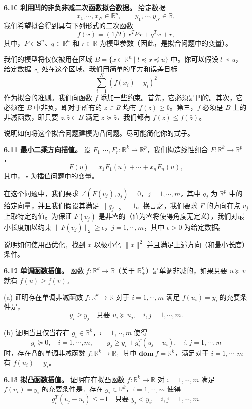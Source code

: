 \documentclass[UTF8, 12pt, fontset=fandol, oneside]{ctexart}
\begin{document}
\noindent\textbf{6.10 利用凹的非负非减二次函数拟合数据。}\quad
给定数据
\[
x_1,\cdots,x_N\in\mathbb{R}^n,\qquad y_1,\cdots,y_N\in\mathbb{R},
\]
我们希望拟合得到具有下列形式的二次函数
\[
f(x)=(1/2)x^TPx+q^Tx+r,
\]
其中，$P\in\mathbf{S}^n$、$q\in\mathbb{R}^n$ 和 $r\in\mathbb{R}$ 为模型参数（因此，是拟合问题中的变量）。

我们的模型将仅仅被用在区域 $B=\{x\in\mathbb{R}^n\mid l\preceq x\preceq u\}$ 中。你可以假设 $l\prec u$，给定数据 $x_i$ 处在这个区域。我们用简单的平方和误差目标
\[
\sum_{i=1}^N(f(x_i)-y_i)^2
\]
作为拟合的准则。我们向函数 $f$ 添加一些约束。首先，它必须是凹的。其次，它必须在 $B$ 中非负，即对于所有的 $z\in B$ 均有 $f(z)\geq 0$。第三，$f$ 必须是 $B$ 上的非减函数，即只要 $z,\bar{z}\in B$ 满足 $z\succeq \bar{z}$，我们都有 $f(z)\leq f(\bar{z})$。

说明如何将这个拟合问题建模为凸问题。尽可能简化你的式子。

\noindent\textbf{6.11 最小二乘方向插值。}\quad
设 $F_1,\cdots,F_n:\mathbb{R}^k\to\mathbb{R}^p$，我们构造线性组合 $F:\mathbb{R}^k\to\mathbb{R}^p$，
\[
F(u)=x_1F_1(u)+\cdots+x_nF_n(u),
\]
其中，$x$ 为插值问题中的变量。

在这个问题中，我们要求 $\angle(F(v_j),q_j)=0$，$j=1,\cdots,m$，其中 $q_j$ 为 $\mathbb{R}^p$ 中的给定向量，并且我们假设其满足 $\|q_j\|_2=1$。换言之，我们要求 $F$ 的方向在点 $v_j$ 上取特定的值。为保证 $F(v_j)$ 是非零的（值为零将使得角度无定义），我们对最小长度加以约束 $\|F(v_j)\|_2\geq \epsilon$，$j=1,\cdots,m$，其中 $\epsilon>0$ 为给定数据。

说明如何使用凸优化，找到 $x$ 以极小化 $\|x\|^2$ 并且满足上述方向（和最小长度）条件。

\noindent\textbf{6.12 单调函数插值。}\quad
函数 $f:\mathbb{R}^k\to\mathbb{R}$（关于 $\mathbb{R}_+^k$）是单调非减的，如果只要 $u\succeq v$ 就有 $f(u)\geq f(v)$。

(a) 证明存在单调非减函数 $f:\mathbb{R}^k\to\mathbb{R}$ 对于 $i=1,\cdots,m$ 满足 $f(u_i)=y_i$ 的充要条件是，
\[
y_i\geq y_j\quad \text{只要 }u_i\succeq u_j,\quad i,j=1,\cdots,m.
\]

(b) 证明当且仅当存在 $g_i\in\mathbb{R}^k$，$i=1,\cdots,m$ 使得
\[
g_i\succeq 0,\quad i=1,\cdots,m,\qquad
y_j\geq y_i+g_i^T(u_j-u_i),\quad i,j=1,\cdots,m
\]
时，存在凸的单调非减函数 $f:\mathbb{R}^k\to\mathbb{R}$，其中 $\mathbf{dom}\ f=\mathbb{R}^k$，满足对于 $i=1,\cdots,m$ 有 $f(u_i)=y_i$。

\noindent\textbf{6.13 拟凸函数插值。}\quad
证明存在拟凸函数 $f:\mathbb{R}^k\to\mathbb{R}$ 对 $i=1,\cdots,m$ 满足 $f(u_i)=y_i$ 的充要条件是，存在 $g_i\in\mathbb{R}^k$，$i=1,\cdots,m$ 使得
\[
g_i^T(u_j-u_i)\leq -1\quad \text{只要 } y_j<y_i,\quad i,j=1,\cdots,m.
\]
\end{document}
